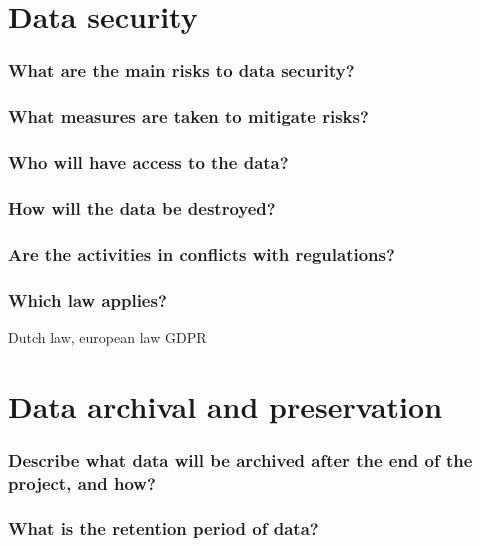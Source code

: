 \documentclass[a4paper]{article}
\begin{document}
\section{Data security}

\subsubsection{What are the main risks to data security?}

\subsubsection{What measures are taken to mitigate risks?}

\subsubsection{Who will have access to the data?}

\subsubsection{How will the data be destroyed?}

\subsubsection{Are the activities in conflicts with regulations?}

\subsubsection{Which law applies?}

Dutch law, european law GDPR

\section{Data archival and preservation}

\subsubsection{Describe what data will be archived after the end of the project, and how?}

\subsubsection{What is the retention period of data?}
\end{document}
